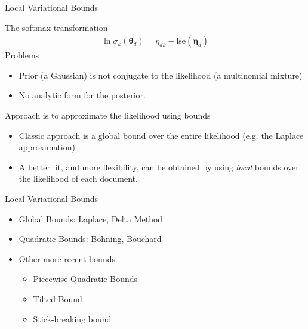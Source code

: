 \documentclass[xcolor=dvipsnames]{beamer}
\newcommand \vv[1] { \boldsymbol #1 }
\newcommand \thd[0]  { { \vv \theta_d } }
\newcommand \lse { \text{lse} }
\begin{document}


\begin{frame}{Local Variational Bounds}

The softmax transformation
\begin{align}
    \ln \sigma_k\left(\thd\right) = \eta_{dk} - \lse(\vv{\eta}_d)
\end{align}
Problems
\begin{itemize}
    \item Prior (a Gaussian) is not conjugate to the likelihood (a multinomial mixture)
    \item No analytic form for the posterior.
\end{itemize}
Approach is to approximate the likelihood using bounds
\begin{itemize}
    \item Classic approach is a global bound over the entire likelihood (e.g. the Laplace approximation)
    \item A better fit, and more flexibility, can be obtained by using \emph{local} bounds over the likelihood of each document.
\end{itemize}

\end{frame}



\begin{frame}{Local Variational Bounds}

\begin{itemize}
    \item Global Bounds: Laplace, Delta Method\cite{Wang2013a}
    \item Quadratic Bounds: Bohning\cite{Bohning1988a}, Bouchard\cite{Bouchard2007}
    \item Other more recent bounds
    \begin{itemize}
        \item Piecewise Quadratic Bounds\cite{Marlin2011}
        \item Tilted Bound\cite{MinkaKnowles}
        \item Stick-breaking bound\cite{Khan2012stick}
    \end{itemize}
\end{itemize}


\end{frame}


\end{document}
